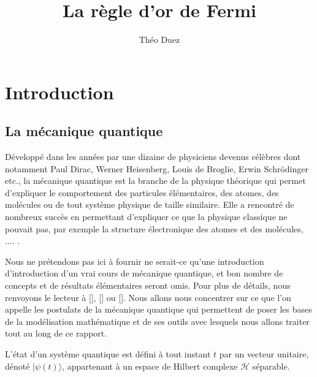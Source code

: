 \documentclass[12pt,openany,a4paper, titlepage]{article}
\title{La règle d'or de Fermi}
\author{Théo Duez }
\newcommand{\HH}{\mathcal{H}}
\theoremstyle{definition}
\theoremstyle{definition}
\theoremstyle{definition}
\theoremstyle{definition}
\theoremstyle{definition}
\begin{document}
\maketitle

\newpage

\tableofcontents

\newpage

\section{Introduction}

\subsection{La mécanique quantique}

Développé dans les années par une dizaine de physiciens devenus célèbres dont notamment Paul Dirac, Werner Heisenberg, Louis de Broglie, Erwin Schrödinger etc.,  la mécanique quantique est la branche de la physique théorique qui permet d'expliquer le comportement des particules élémentaires, des atomes, des molécules ou de tout système physique de taille similaire. Elle a rencontré de nombreux succès en permettant d'expliquer ce que la physique classique ne pouvait pas, par exemple la structure électronique des atomes et des molécules, .... . 

Nous ne prétendons pas ici à fournir ne serait-ce qu'une introduction d'introduction d'un vrai cours de mécanique quantique, et bon nombre de concepts et de résultats élémentaires seront omis. Pour plus de détails, nous renvoyons le lecteur à [], [] ou []. Nous allons nous concentrer sur ce que l'on appelle les postulats de la mécanique quantique qui permettent de poser les bases de la modélisation mathématique et de ses outils avec lesquels nous allons traiter tout au long de ce rapport.

\vspace{3mm}
\begin{tcolorbox}[colback=gray!5!white,
                  colframe=gray!80!white,
                  title= Postulat 1 : Principe de superposition ]
L'état d'un système quantique est défini à tout instant $t$ par un vecteur unitaire, dénoté $|\psi(t)\rangle$, appartenant à un espace de Hilbert complexe $\HH$ séparable.
\end{tcolorbox}
\vspace{3mm}

\vspace{3mm}
\begin{tcolorbox}[colback=gray!5!white,
                  colframe=gray!80!white,
                  title= Postulat 2 : Principe de correspondance ]

\end{tcolorbox}
\vspace{3mm}
\end{document}
